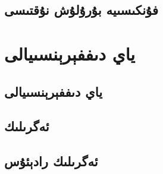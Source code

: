 \subsection{فۇنكىسىيە بۇرۇلۇش نۇقتىسى}

\section{ياي دىففېرېنسىيالى}
\subsection{ياي دىففېرېنسىيالى}
\subsection{ئەگرىلىك}
\subsection{ئەگرىلىك رادېئۇس}
